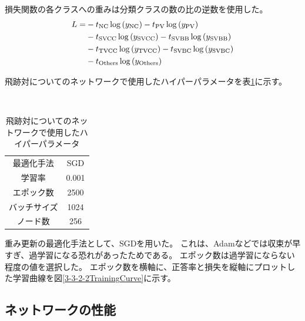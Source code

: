 損失関数の各クラスへの重みは分類クラスの数の比の逆数を使用した。
\begin{equation}
 \begin{split}
 L = &- t_{\rm NC} \log{(y_{\rm NC})} -  t_{\rm PV} \log{(y_{\rm PV})} \\
       & -  t_{\rm SVCC} \log{(y_{\rm SVCC})} -  t_{\rm SVBB} \log{(y_{\rm SVBB})}\\
       & -  t_{\rm TVCC} \log{(y_{\rm TVCC})} -  t_{\rm SVBC} \log{(y_{\rm SVBC})}\\
       & -  t_{\rm Others} \log{(y_{\rm Others})}\\
 \end{split}
\end{equation}

飛跡対についてのネットワークで使用したハイパーパラメータを表\ref{HyperparametersforPairModel}に示す。

\begin{table}[htb]
 \centering
　\small
  \begin{tabular}{c c}\hline
    最適化手法 & SGD\\
    学習率 & 0.001\\
    エポック数 & 2500\\
    バッチサイズ & 1024\\
    ノード数 & 256\\ \hline
  \end{tabular}
  \caption{飛跡対についてのネットワークで使用したハイパーパラメータ}
  \label{HyperparametersforPairModel}
\end{table}

重み更新の最適化手法として、SGDを用いた。
これは、Adamなどでは収束が早すぎ、過学習になる恐れがあったためである。
エポック数は過学習にならない程度の値を選択した。
エポック数を横軸に、正答率と損失を縦軸にプロットした学習曲線を図\ref{3-3-2-2TrainingCurve}に示す。



\subsection{ネットワークの性能} \label{Net:PM:PerformanceofPM}

